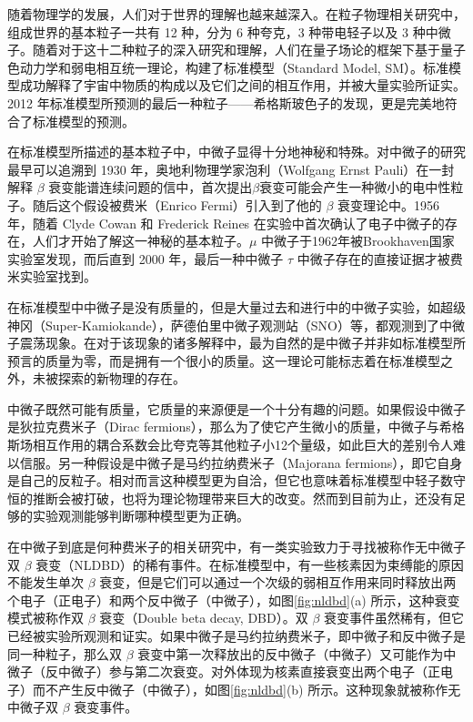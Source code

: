 
随着物理学的发展，人们对于世界的理解也越来越深入。在粒子物理相关研究中，组成世界的基本粒子一共有 12 种，分为 6 种夸克，3 种带电轻子以及 3 种中微子。随着对于这十二种粒子的深入研究和理解，人们在量子场论的框架下基于量子色动力学和弱电相互统一理论，构建了标准模型（Standard Model, SM）。标准模型成功解释了宇宙中物质的构成以及它们之间的相互作用，并被大量实验所证实。2012 年标准模型所预测的最后一种粒子——希格斯玻色子的发现，更是完美地符合了标准模型的预测。

在标准模型所描述的基本粒子中，中微子显得十分地神秘和特殊。对中微子的研究最早可以追溯到 1930 年，奥地利物理学家泡利（Wolfgang Ernst Pauli）在一封解释 $\beta$ 衰变能谱连续问题的信中，首次提出$\beta$衰变可能会产生一种微小的电中性粒子。随后这个假设被费米（Enrico Fermi）引入到了他的 $\beta$ 衰变理论中\supercite{wilson1968fermi}。1956 年，随着 Clyde Cowan 和 Frederick Reines 在实验中首次确认了电子中微子的存在\supercite{cowan1991detection}，人们才开始了解这一神秘的基本粒子。$\mu$ 中微子于1962年被Brookhaven国家实验室发现\supercite{danby1962observation}，而后直到 2000 年，最后一种中微子 $\tau$ 中微子存在的直接证据才被费米实验室找到\supercite{kodama2001observation}。

在标准模型中中微子是没有质量的，但是大量过去和进行中的中微子实验，如超级神冈（Super-Kamiokande）\supercite{fukuda1998evidence}，萨德伯里中微子观测站（SNO）\supercite{ahmad2002direct}等，都观测到了中微子震荡现象。在对于该现象的诸多解释中，最为自然的是中微子并非如标准模型所预言的质量为零，而是拥有一个很小的质量。这一理论可能标志着在标准模型之外，未被探索的新物理的存在。

中微子既然可能有质量，它质量的来源便是一个十分有趣的问题。如果假设中微子是狄拉克费米子（Dirac fermions），那么为了使它产生微小的质量，中微子与希格斯场相互作用的耦合系数会比夸克等其他粒子小12个量级，如此巨大的差别令人难以信服。另一种假设是中微子是马约拉纳费米子（Majorana fermions），即它自身是自己的反粒子。相对而言这种模型更为自洽，但它也意味着标准模型中轻子数守恒的推断会被打破，也将为理论物理带来巨大的改变。然而到目前为止，还没有足够的实验观测能够判断哪种模型更为正确。

在中微子到底是何种费米子的相关研究中，有一类实验致力于寻找被称作无中微子双 $\beta$ 衰变（NLDBD）\supercite{avignone2008double}的稀有事件。在标准模型中，有一些核素因为束缚能的原因不能发生单次 $\beta$ 衰变，但是它们可以通过一个次级的弱相互作用来同时释放出两个电子（正电子）和两个反中微子（中微子），如图\ref{fig:nldbd}(a) 所示，这种衰变模式被称作双 $\beta$ 衰变（Double beta decay, DBD）。双 $\beta$ 衰变事件虽然稀有，但它已经被实验所观测和证实。如果中微子是马约拉纳费米子，即中微子和反中微子是同一种粒子，那么双 $\beta$ 衰变中第一次释放出的反中微子（中微子）又可能作为中微子（反中微子）参与第二次衰变。对外体现为核素直接衰变出两个电子（正电子）而不产生反中微子（中微子），如图\ref{fig:nldbd}(b) 所示。这种现象就被称作无中微子双 $\beta$ 衰变事件。

